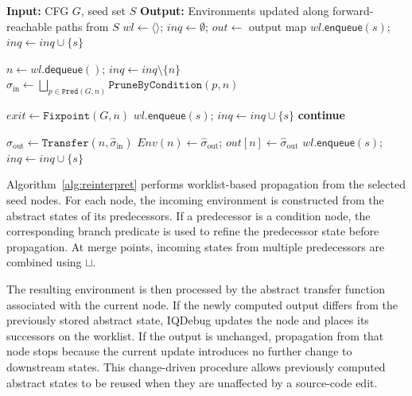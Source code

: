 \documentclass[11pt,oneside]{report}
\theoremstyle{plain}
\theoremstyle{definition}
\theoremstyle{remark}
\newcommand{\Env}{\mathit{Env}}
\begin{document}
\begin{algorithm}[!t]
\caption{Incremental Interpretation}
\label{alg:reinterpret}
\begin{algorithmic}[1]
\State \textbf{Input:} CFG $G$, seed set $S$
\State \textbf{Output:} Environments updated along forward-reachable paths from $S$
  \State $wl\gets\langle\rangle$; \quad $inq\gets\emptyset$; \quad $out\gets$ output map
     \State $wl.\textsf{enqueue}(s)$; \quad $inq\gets inq\cup\{s\}$ \EndIf
  \EndFor

    \State $n \gets wl.\textsf{dequeue}()$; \quad $inq\gets inq\setminus\{n\}$
    \State $\hat{\sigma}_{\mathrm{in}}\gets \bigsqcup_{p\in\texttt{Pred}(G, n)} \texttt{PruneByCondition}(p,n)$

       \State $exit \gets \texttt{Fixpoint}(G, n)$ 
          \State $wl.\textsf{enqueue}(s)$; \quad $inq\gets inq\cup\{s\}$ \EndIf
       \EndFor
       \State \textbf{continue}
    \EndIf

    \State $\hat{\sigma}_{\mathrm{out}}\gets \texttt{Transfer}(n,\hat{\sigma}_{\mathrm{in}})$
       \State $\Env(n)\gets \hat{\sigma}_{\mathrm{out}}$; \quad $out[n]\gets \hat{\sigma}_{\mathrm{out}}$
          \State $wl.\textsf{enqueue}(s)$; \quad $inq\gets inq\cup\{s\}$ \EndIf
       \EndFor
    \EndIf
  \EndWhile
\EndFunction
\end{algorithmic}
\end{algorithm}

Algorithm~\ref{alg:reinterpret} performs worklist-based propagation from the selected seed nodes.
For each node, the incoming environment is constructed from the abstract states of its predecessors.
If a predecessor is a condition node, the corresponding branch predicate is used to refine the predecessor state before propagation.
At merge points, incoming states from multiple predecessors are combined using \(\sqcup\).

The resulting environment is then processed by the abstract transfer function associated with the current node.
If the newly computed output differs from the previously stored abstract state, IQDebug updates the node and places its successors on the worklist.
If the output is unchanged, propagation from that node stops because the current update introduces no further change to downstream states.
This change-driven procedure allows previously computed abstract states to be reused when they are unaffected by a source-code edit.
\end{document}
